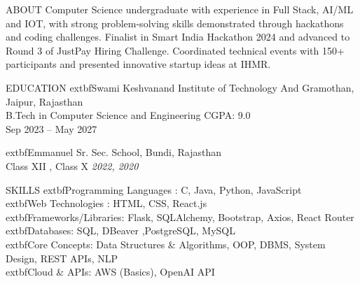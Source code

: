 \documentclass{resume}
\begin{document}
\begin{rSection}{ABOUT}
Computer Science undergraduate with experience in Full Stack, AI/ML and IOT, with strong problem-solving skills demonstrated through hackathons and coding challenges. Finalist in Smart India Hackathon 2024 and advanced to Round 3 of JustPay Hiring Challenge. Coordinated technical events with 150+ participants and presented innovative startup ideas at IHMR.
\end{rSection}
\begin{rSection}{EDUCATION}
	extbf{Swami Keshvanand Institute of Technology And Gramothan}, Jaipur, Rajasthan \\
B.Tech in Computer Science and Engineering \hfill CGPA: 9.0 \\
Sep 2023 – May 2027

	extbf{Emmanuel Sr. Sec. School}, Bundi, Rajasthan \\
Class XII , Class X  \hfill\hfill \textit{2022, 2020} 
\end{rSection}

\begin{rSection}{SKILLS}
	extbf{Programming Languages :} C, Java, Python, JavaScript\\
	extbf{Web Technologies :} HTML, CSS, React.js  \\
	extbf{Frameworks/Libraries:} Flask, SQLAlchemy, Bootstrap, Axios, React Router\\
	extbf{Databases:} SQL, DBeaver ,PostgreSQL, MySQL  \\
	extbf{Core Concepts:} Data Structures \& Algorithms, OOP, DBMS, System Design, REST APIs, NLP \\
	extbf{Cloud \& APIs:} AWS (Basics), OpenAI API
\end{rSection}
\end{document}
